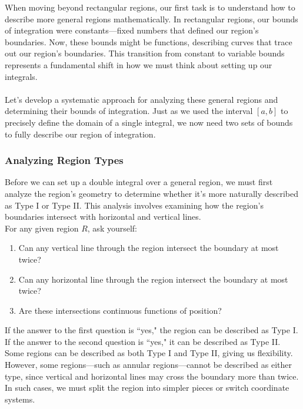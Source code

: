 \noindent When moving beyond rectangular regions, our first task is to understand how to describe more general regions mathematically. In rectangular regions, our bounds of integration were constants—fixed numbers that defined our region's boundaries. Now, these bounds might be functions, describing curves that trace out our region's boundaries. This transition from constant to variable bounds represents a fundamental shift in how we must think about setting up our integrals. \\ \\
Let's develop a systematic approach for analyzing these general regions and determining their bounds of integration. Just as we used the interval $[a,b]$ to precisely define the domain of a single integral, we now need two sets of bounds to fully describe our region of integration.





\subsubsection*{Analyzing Region Types}

\noindent Before we can set up a double integral over a general region, we must first analyze the region's geometry to determine whether it's more naturally described as Type I or Type II. This analysis involves examining how the region's boundaries intersect with horizontal and vertical lines. \\

\noindent For any given region $R$, ask yourself:
\begin{enumerate}
    \item Can any vertical line through the region intersect the boundary at most twice?
    \item Can any horizontal line through the region intersect the boundary at most twice?
    \item Are these intersections continuous functions of position?
\end{enumerate}

\noindent If the answer to the first question is ``yes," the region can be described as Type I. If the answer to the second question is ``yes," it can be described as Type II. Some regions can be described as both Type I and Type II, giving us flexibility. However, some regions---such as annular regions---cannot be described as either type, since vertical and horizontal lines may cross the boundary more than twice. In such cases, we must split the region into simpler pieces or switch coordinate systems.


